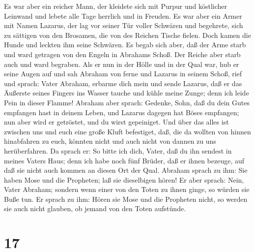  Es war aber ein reicher Mann, der kleidete sich mit Purpur
und köstlicher Leinwand und lebete alle Tage herrlich und in Freuden.
 Es war aber ein Armer mit Namen Lazarus, der lag vor
seiner Tür voller Schwären  und begehrete, sich zu sättigen
von den Brosamen, die von des Reichen Tische fielen. Doch kamen die
Hunde und leckten ihm seine Schwären.  Es begab sich aber,
daß der Arme starb und ward getragen von den Engeln in Abrahams Schoß.
Der Reiche aber starb auch und ward begraben.  Als er nun
in der Hölle und in der Qual war, hub er seine Augen auf und sah Abraham
von ferne und Lazarus in seinem Schoß,  rief und sprach:
Vater Abraham, erbarme dich mein und sende Lazarus, daß er das Äußerste
seines Fingers ins Wasser tauche und kühle meine Zunge; denn ich leide
Pein in dieser Flamme!  Abraham aber sprach: Gedenke, Sohn,
daß du dein Gutes empfangen hast in deinem Leben, und Lazarus dagegen
hat Böses empfangen; nun aber wird er getröstet, und du wirst
gepeiniget.  Und über das alles ist zwischen uns und euch
eine große Kluft befestiget, daß, die da wollten von hinnen hinabfahren
zu euch, könnten nicht und auch nicht von dannen zu uns herüberfahren.
 Da sprach er: So bitte ich dich, Vater, daß du ihn sendest
in meines Vaters Haus;  denn ich habe noch fünf Brüder, daß
er ihnen bezeuge, auf daß sie nicht auch kommen an diesen Ort der Qual.
 Abraham sprach zu ihm: Sie haben Mose und die Propheten;
laß sie dieselbigen hören!  Er aber sprach: Nein, Vater
Abraham; sondern wenn einer von den Toten zu ihnen ginge, so würden sie
Buße tun.  Er sprach zu ihm: Hören sie Mose und die
Propheten nicht, so werden sie auch nicht glauben, ob jemand von den
Toten aufstünde.

\hypertarget{section-16}{%
\section{17}\label{section-16}}

